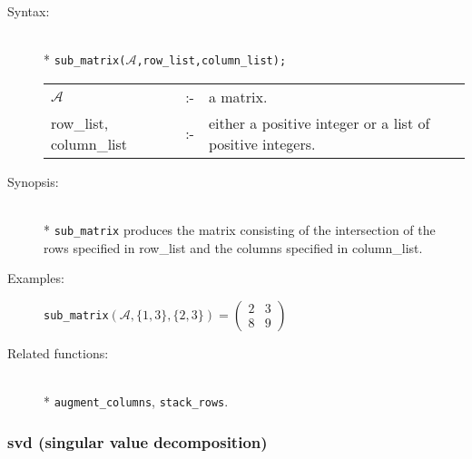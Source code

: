 \begin{description}
\item[Syntax:]\mbox{}\\*
\texttt{sub\_matrix($\mathcal{A}$,row\_list,column\_list);}\\[2mm]
\begin{tabular}{l l p{.605\linewidth}}
$\mathcal{A}$              &:-& a matrix. \\
row\_list, column\_list &:-& either a
positive integer or a list of positive integers.
\end{tabular}

\item[Synopsis:]\mbox{}\\*
\texttt{sub\_matrix} produces the matrix consisting of the
              intersection of the rows specified in row\_list and the
columns specified in column\_list.

\item[Examples:]
\begin{flushleft}
\texttt{sub\_matrix}\((\mathcal{A},\{1,3\},\{2,3\}) =
        \begin{pmatrix} 2 & 3 \\ 8 & 9 \end{pmatrix}\)
\end{flushleft}

\item[Related functions:]\mbox{}\\*
\texttt{augment\_columns}, \texttt{stack\_rows}.
\end{description}


\subsubsection{svd (singular value decomposition)}
\label{linalg:svd}

